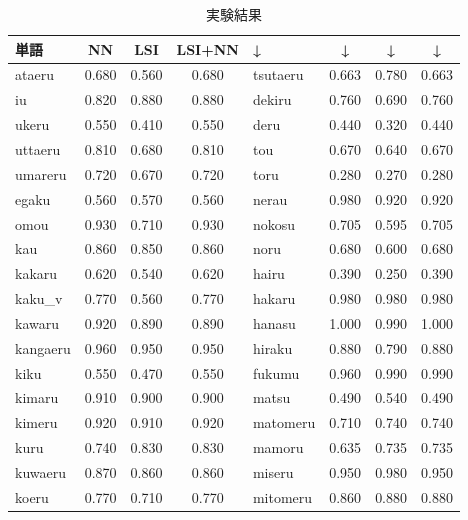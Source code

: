 \begin{table}[htbp]
  \begin{center}
    \leavevmode
    \caption{実験結果}\label{result1}
    \begin{tabular}{|p{}|c|c|c||p{}|c|c|c|} \hline
    単語   & NN       &  LSI   & LSI+NN   & ↓ & ↓  & ↓  & ↓ \\ \hline
ataeru     & 0.680   & 0.560 & 0.680  &      tsutaeru   & 0.663   & 0.780 & 0.663    \\
iu         & 0.820   & 0.880 & 0.880  &      dekiru     & 0.760   & 0.690 & 0.760    \\
ukeru      & 0.550   & 0.410 & 0.550  &      deru       & 0.440   & 0.320 & 0.440    \\
uttaeru    & 0.810   & 0.680 & 0.810  &      tou        & 0.670   & 0.640 & 0.670    \\
umareru    & 0.720   & 0.670 & 0.720  &      toru       & 0.280   & 0.270 & 0.280    \\
egaku      & 0.560   & 0.570 & 0.560  &      nerau      & 0.980   & 0.920 & 0.920    \\
omou       & 0.930   & 0.710 & 0.930  &      nokosu     & 0.705   & 0.595 & 0.705    \\
kau        & 0.860   & 0.850 & 0.860  &      noru       & 0.680   & 0.600 & 0.680    \\
kakaru     & 0.620   & 0.540 & 0.620  &      hairu      & 0.390   & 0.250 & 0.390    \\
kaku\_v    & 0.770   & 0.560 & 0.770  &      hakaru     & 0.980   & 0.980 & 0.980    \\
kawaru     & 0.920   & 0.890 & 0.890  &      hanasu     & 1.000   & 0.990 & 1.000    \\
kangaeru   & 0.960   & 0.950 & 0.950  &      hiraku     & 0.880   & 0.790 & 0.880    \\
kiku       & 0.550   & 0.470 & 0.550  &      fukumu     & 0.960   & 0.990 & 0.990    \\
kimaru     & 0.910   & 0.900 & 0.900  &      matsu      & 0.490   & 0.540 & 0.490    \\
kimeru     & 0.920   & 0.910 & 0.920  &      matomeru   & 0.710   & 0.740 & 0.740    \\
kuru       & 0.740   & 0.830 & 0.830  &      mamoru     & 0.635   & 0.735 & 0.735    \\
kuwaeru    & 0.870   & 0.860 & 0.860  &      miseru     & 0.950   & 0.980 & 0.950    \\
koeru      & 0.770   & 0.710 & 0.770  &      mitomeru   & 0.860   & 0.880 & 0.880    \\

\end{tabular}
\end{center}
\end{table}
